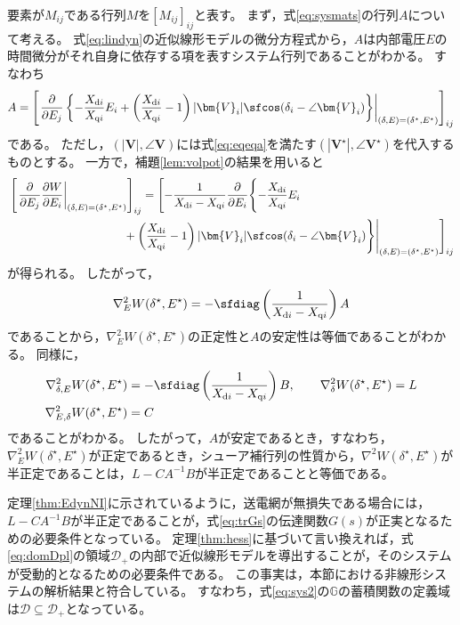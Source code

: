 \documentclass[tombow,dvipdfmx]{corona-a5}
\begin{document}
\begin{証明}
要素が$M_{ij}$である行列$M$を$[M_{ij}]_{ij}$と表す。
まず，式\ref{eq:sysmats}の行列$A$について考える。
式\ref{eq:lindyn}の近似線形モデルの微分方程式から，$A$は内部電圧$E$の時間微分がそれ自身に依存する項を表すシステム行列であることがわかる。
すなわち
\begin{align*}
A = \left[
\left.
\frac{\partial}{\partial E_j}
\left\{
-\frac{X_{{\rm d}i}}{X_{{\rm q}i}}E_i
+\left(
\frac{X_{{\rm d}i}}{X_{{\rm q}i}}-1
\right)
|\bm{V}_i| \sfcos (\delta_i - \angle \bm{V}_i ) 
\right\}
\right|_{(\delta,E)=(\delta^{\star},E^{\star})}
\right]_{ij}
\end{align*}
である。
ただし，$(|\bm{V}|,\angle \bm{V})$には式\ref{eq:eqeqa}を満たす$(|\bm{V}^{\star}|,\angle \bm{V}^{\star})$を代入するものとする。
一方で，補題\ref{lem:volpot}の結果を用いると
\begin{align*}
&\left[
\left.
\frac{\partial}{\partial E_j}
\frac{\partial W}{\partial E_i}
\right|_{(\delta,E)=(\delta^{\star},E^{\star})}
\right]_{ij}
=
\Biggl[
\Biggl.
-\frac{1}{X_{{\rm d}i} - X_{{\rm q}i}}
\frac{\partial}{\partial E_i}
\Biggl\{
-\frac{X_{{\rm d}i}}{X_{{\rm q}i}}E_i
\\
&\hspace{10em}
+\left(
\frac{X_{{\rm d}i}}{X_{{\rm q}i}}-1
\right)
|\bm{V}_i| \sfcos (\delta_i - \angle \bm{V}_i ) 
\Biggr\}
\Biggr|_{(\delta,E)=(\delta^{\star},E^{\star})}
\Biggr]_{ij}
\end{align*}
が得られる。
したがって，
\begin{align*}
\nabla^2_{E} W(\delta^{\star}, E^{\star})
= 
-\sfdiag\left(
\frac{1}{X_{{\rm d}i} - X_{{\rm q}i}}
\right)
A
\end{align*}
であることから，$\nabla^2_{E} W(\delta^{\star}, E^{\star})$の正定性と$A$の安定性は等価であることがわかる。
同様に，
\begin{align*}
\nabla^2_{\delta,E} W(\delta^{\star}, E^{\star})
&=
-\sfdiag\left(
\frac{1}{X_{{\rm d}i} - X_{{\rm q}i}}
\right)
B,
\qquad
\nabla^2_{\delta} W(\delta^{\star}, E^{\star})
=L
\\
\nabla^2_{E,\delta} W(\delta^{\star}, E^{\star})
& =
C
\end{align*}
であることがわかる。
したがって，$A$が安定であるとき，すなわち，$\nabla^2_{E} W(\delta^{\star}, E^{\star})$が正定であるとき，シューア補行列の性質から，$\nabla^2 W(\delta^{\star}, E^{\star})$が半正定であることは，$L-CA^{-1}B$が半正定であることと等価である。
\end{証明}

定理\ref{thm:EdynNI}に示されているように，送電網が無損失である場合には，$L-CA^{-1}B$が半正定であることが，式\ref{eq:trGs}の伝達関数$G(s)$が正実となるための必要条件となっている。
定理\ref{thm:hess}に基づいて言い換えれば，式\ref{eq:domDpl}の領域$\mathcal{D}_{+}$の内部で近似線形モデルを導出することが，そのシステムが受動的となるための必要条件である。
この事実は，本節における非線形システムの解析結果と符合している。
すなわち，式\ref{eq:sys2}の$\mathds{G}$の蓄積関数の定義域は$\mathcal{D}\subseteq \mathcal{D}_{+}$となっている。
\end{document}
